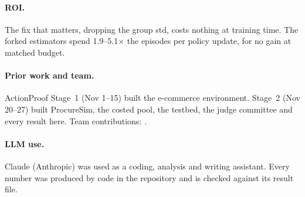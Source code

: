 \paragraph{ROI.} The fix that matters, dropping the group std, costs nothing at training time. The forked estimators
spend 1.9--5.1$\times$ the episodes per policy update, for no gain at matched budget.

\paragraph{Prior work and team.} ActionProof Stage~1 (Nov 1--15) built the e-commerce environment. Stage~2 (Nov
20--27) built ProcureSim, the costed pool, the testbed, the judge committee and every result here. Team
contributions: .

\paragraph{LLM use.} Claude (Anthropic) was used as a coding, analysis and writing assistant. Every number was
produced by code in the repository and is checked against its result file.
